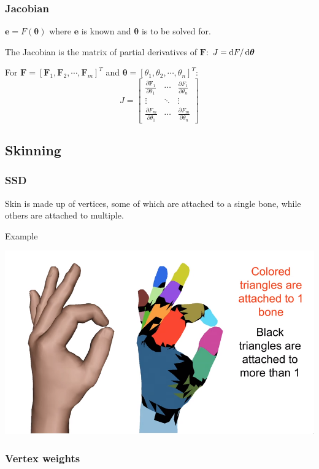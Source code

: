 \documentclass[12pt]{article}
\begin{document}
\subsubsection{Jacobian}

$\bm e = F(\bm \theta)$ where $\bm e$ is known and $\bm \theta$
is to be solved for.

The Jacobian is the matrix of partial derivatives
of $\bm F$: $J = \mathop{}\!\mathrm{d} F/\mathop{}\!\mathrm{d} \bm \theta$

For $\bm F = [\bm F_1,\bm F_2,\cdots,\bm F_m]^T$ and $\bm \theta
= [\theta_1,\theta_2,\cdots,\theta_n]^T$:
\[
    J =
    \begin{bmatrix}
        \frac{\partial \bm F_1}{\partial \theta_1} & \cdots & \frac{\partial F_1}{\partial \theta_n}\\
        \vdots & \ddots & \vdots\\
        \frac{\partial F_m}{\partial \theta_1} & \cdots & \frac{\partial F_m}{\partial \theta_n}
    \end{bmatrix}
\]

\subsection{Skinning}

\subsubsection{SSD}

Skin is made up of vertices, some of which are attached
to a single bone, while others are attached to multiple.

Example

\includegraphics[scale=.4]{images/skinning-vertices.png}

\subsubsection{Vertex weights}
\end{document}
